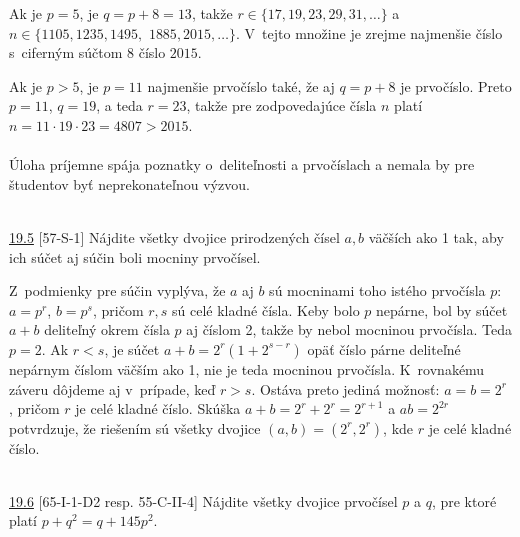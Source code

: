 Ak je $p = 5$, je $q = p + 8 = 13$, takže $r \in \{17, 19, 23, 29, 31, \ldots \}$ a $n \in \{1 105,1 235, 1 495,$ $1 885, 2 015, \ldots\}$. V~tejto množine je zrejme najmenšie číslo s~ciferným súčtom 8 číslo $2 015$.

Ak je $p > 5$, je $p = 11$ najmenšie prvočíslo také, že aj $q = p + 8$ je prvočíslo. Preto $p = 11$, $q = 19$, a teda $r = 23$, takže pre zodpovedajúce čísla $n$ platí $n = 11 \cdot 19 \cdot 23= 4 807 > 2 015$.\\
\\
\kom Úloha príjemne spája poznatky o~deliteľnosti a prvočíslach a nemala by pre študentov byť neprekonateľnou výzvou.\\
\\
\begin{tcolorbox}[breakable,notitle,boxrule=0pt,colback=light-gray,colframe=light-gray]\ul{19.5} [57-S-1]
Nájdite všetky dvojice prirodzených čísel $a, b$ väčších ako 1 tak, aby ich súčet aj súčin boli mocniny prvočísel.

\end{tcolorbox}

\rieh Z~podmienky pre súčin vyplýva, že $a$ aj $b$ sú mocninami toho istého prvočísla $p$: $a = p^r$, $b = p^s$, pričom $r, s$ sú celé kladné čísla. Keby bolo $p$ nepárne, bol by súčet $a + b$ deliteľný okrem čísla $p$ aj číslom 2, takže by nebol mocninou prvočísla. Teda $p = 2$. Ak $r < s$, je súčet $a + b = 2^r (1 + 2^{s-r})$ opäť číslo párne deliteľné nepárnym číslom väčším ako 1, nie je teda mocninou prvočísla. K~rovnakému záveru dôjdeme aj v~prípade, keď $r > s$. Ostáva preto jediná možnosť: $a = b = 2^r$ , pričom $r$ je celé kladné číslo. Skúška $a+b = 2^r +2^r = 2^{r+1}$ a $ab = 2^{2r}$ potvrdzuje, že riešením sú všetky dvojice $(a, b) = (2^r, 2^r)$, kde $r$ je celé kladné číslo.\\
\\
\begin{tcolorbox}[breakable,notitle,boxrule=0pt,colback=light-gray,colframe=light-gray]\ul{19.6} [65-I-1-D2 resp. 55-C-II-4] Nájdite všetky dvojice prvočísel $p$ a $q$, pre ktoré platí $p + q^2= q + 145p^2$.

\end{tcolorbox}


